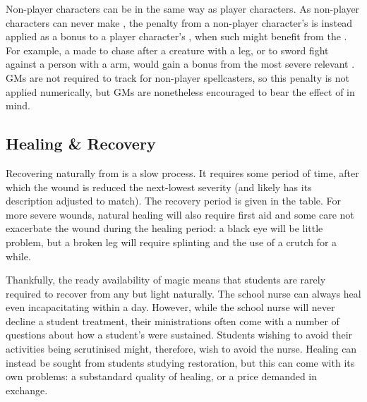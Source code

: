 Non-player characters can be {\wounded} in the same way as player characters.
As non-player characters can never make {\tests}, the penalty from a non-player character's {\wounds} is instead applied as a bonus to a player character's {\tests}, when such {\tests} might benefit from the {\wound}.
For example, a {\test} made to chase after a creature with a {\wounded} leg, or to sword fight against a person with a {\wounded} arm, would gain a bonus from the most severe relevant {\wound}.
GMs are not required to track {\focus} for non-player spellcasters, so this penalty is not applied numerically, but GMs are nonetheless encouraged to bear the effect of {\wounds} in mind.

\subsection{Healing \& Recovery}

Recovering naturally from {\wounds} is a slow process.
It requires some period of time, after which the wound is reduced the next-lowest severity (and likely has its description adjusted to match).
The recovery period is given in the  table.
For more severe wounds, natural healing will also require first aid and some care not exacerbate the wound during the healing period: a black eye will be little problem, but a broken leg will require splinting and the use of a crutch for a while.


Thankfully, the ready availability of magic means that students are rarely required to recover from any but light {\wounds} naturally.
The school nurse can always heal even incapacitating {\wounds} within a day.
However, while the school nurse will never decline a student treatment, their ministrations often come with a number of questions about how a student's {\wounds} were sustained.
Students wishing to avoid their activities being scrutinised might, therefore, wish to avoid the nurse.
Healing can instead be sought from students studying restoration, but this can come with its own problems: a substandard quality of healing, or a price demanded in exchange. %
